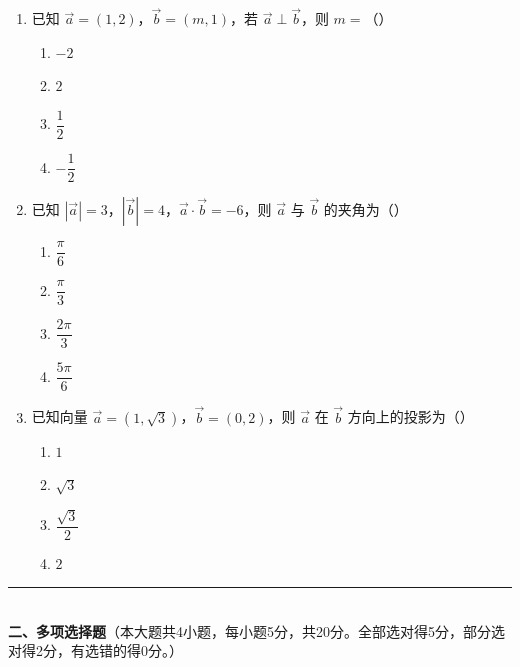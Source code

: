 \documentclass[12pt, a4paper]{ctexart}
\begin{document}
\begin{enumerate}
\item 已知 $\vec{a}=(1,2)$，$\vec{b}=(m,1)$，若 $\vec{a}\perp\vec{b}$，则 $m=$（\quad）
  \begin{enumerate}[label=\Alph*., itemsep=0pt]
    \item $-2$ \quad \item $2$ \quad \item $\dfrac{1}{2}$ \quad \item $-\dfrac{1}{2}$
  \end{enumerate}

\item 已知 $|\vec{a}|=3$，$|\vec{b}|=4$，$\vec{a}\cdot\vec{b}=-6$，则 $\vec{a}$ 与 $\vec{b}$ 的夹角为（\quad）
  \begin{enumerate}[label=\Alph*., itemsep=0pt]
    \item $\dfrac{\pi}{6}$ \quad \item $\dfrac{\pi}{3}$ \quad \item $\dfrac{2\pi}{3}$ \quad \item $\dfrac{5\pi}{6}$
  \end{enumerate}

\item 已知向量 $\vec{a}=(1,\sqrt{3})$，$\vec{b}=(0,2)$，则 $\vec{a}$ 在 $\vec{b}$ 方向上的投影为（\quad）
  \begin{enumerate}[label=\Alph*., itemsep=0pt]
    \item $1$ \quad \item $\sqrt{3}$ \quad \item $\dfrac{\sqrt{3}}{2}$ \quad \item $2$
  \end{enumerate}
\end{enumerate}

\vspace{6pt}

\noindent\rule{\textwidth}{0.4pt}\\[2pt]
{\large\bfseries 二、多项选择题}（本大题共4小题，每小题5分，共20分。全部选对得5分，部分选对得2分，有选错的得0分。）

\vspace{6pt}
\end{document}
